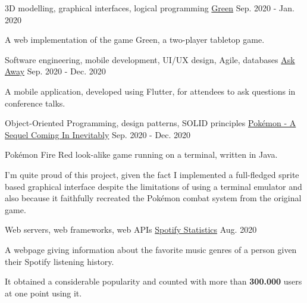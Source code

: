 
\begin{cventries}

  \cventry
    {3D modelling, graphical interfaces, logical programming}   
    {\href{https://github.com/Educorreia932/LAIG/tree/master/TP3}{Green}}   
    {}        
    {Sep. 2020 - Jan. 2020}  
    {
      \begin{cvitems}
        \item {A web implementation of the game Green, a two-player tabletop game.}
      \end{cvitems}
    }
  
  \cventry
    {Software engineering, mobile development, UI/UX design, Agile, databases}   
    {\href{https://github.com/Educorreia932/ESOF}{Ask Away}}   
    {}        
    {Sep. 2020 - Dec. 2020}  
    {
      \begin{cvitems}
        \item {A mobile application, developed using Flutter, for attendees to ask questions in conference talks.}
      \end{cvitems}
    }
    
  \cventry
    {Object-Oriented Programming, design patterns, SOLID principles}  
    {\href{https://github.com/Educorreia932/LPOO/tree/master/Project}{Pokémon - A Sequel Coming In Inevitably}}   
    {}        
    {Sep. 2020 - Dec. 2020}  
    {
      \begin{cvitems}
        \item {Pokémon Fire Red look-alike game running on a terminal, written in Java.}
        \item {I'm quite proud of this project, given the fact I implemented a full-fledged sprite based graphical interface despite the limitations of using a terminal emulator and also because it faithfully recreated the Pokémon combat system from the original game.}
      \end{cvitems}
    } 
  
  \cventry
    {Web servers, web frameworks, web APIs}   
    {\href{https://educorreia932.dev/spotify_statistics}{Spotify Statistics}}   
    {}        
    {Aug. 2020} 
    {
      \begin{cvitems}
        \item {A webpage giving information about the favorite music genres of a person given their Spotify listening history.}
        \item {It obtained a considerable popularity and counted with more than \textbf{300.000} users at one point using it.}
      \end{cvitems}
    }
    

\end{cventries}
